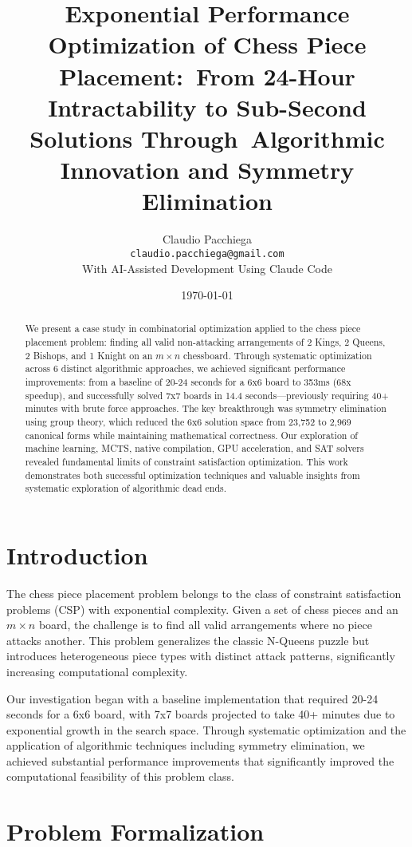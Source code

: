 \documentclass[12pt,a4paper]{article}
\title{Exponential Performance Optimization of Chess Piece Placement:\
From 24-Hour Intractability to Sub-Second Solutions Through\
Algorithmic Innovation and Symmetry Elimination}
\author{Claudio Pacchiega\\
\texttt{claudio.pacchiega@gmail.com}\\
\small{With AI-Assisted Development Using Claude Code}}
\date{\today}
\theoremstyle{definition}
\begin{document}
\maketitle

\begin{abstract}
We present a case study in combinatorial optimization applied to the chess piece placement problem: finding all valid non-attacking arrangements of 2 Kings, 2 Queens, 2 Bishops, and 1 Knight on an $m \times n$ chessboard. Through systematic optimization across 6 distinct algorithmic approaches, we achieved significant performance improvements: from a baseline of 20-24 seconds for a 6x6 board to 353ms (68x speedup), and successfully solved 7x7 boards in 14.4 seconds—previously requiring 40+ minutes with brute force approaches. The key breakthrough was symmetry elimination using group theory, which reduced the 6x6 solution space from 23,752 to 2,969 canonical forms while maintaining mathematical correctness. Our exploration of machine learning, MCTS, native compilation, GPU acceleration, and SAT solvers revealed fundamental limits of constraint satisfaction optimization. This work demonstrates both successful optimization techniques and valuable insights from systematic exploration of algorithmic dead ends.
\end{abstract}

\section{Introduction}

The chess piece placement problem belongs to the class of constraint satisfaction problems (CSP) with exponential complexity. Given a set of chess pieces and an $m \times n$ board, the challenge is to find all valid arrangements where no piece attacks another. This problem generalizes the classic N-Queens puzzle but introduces heterogeneous piece types with distinct attack patterns, significantly increasing computational complexity.

Our investigation began with a baseline implementation that required 20-24 seconds for a 6x6 board, with 7x7 boards projected to take 40+ minutes due to exponential growth in the search space. Through systematic optimization and the application of algorithmic techniques including symmetry elimination, we achieved substantial performance improvements that significantly improved the computational feasibility of this problem class.

\section{Problem Formalization}
\end{document}
